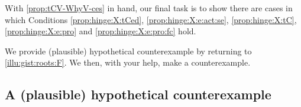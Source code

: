\begin{note}
  With \autoref{prop:tCV-WhyV-ces} in hand, our final task is to show there are cases in which Conditions \ref{prop:hinge:X:tCed}, \ref{prop:hinge:X:e:act:se}, \ref{prop:hinge:X:tC}, \ref{prop:hinge:X:e:pro} and \ref{prop:hinge:X:e:pro:fc} hold.
\end{note}


\begin{note}
  We provide (plausible) hypothetical counterexample by returning to \autoref{illu:gist:roots:F}.
  We then, with your help, make a counterexample.
\end{note}



\subsection{A (plausible) hypothetical counterexample}


